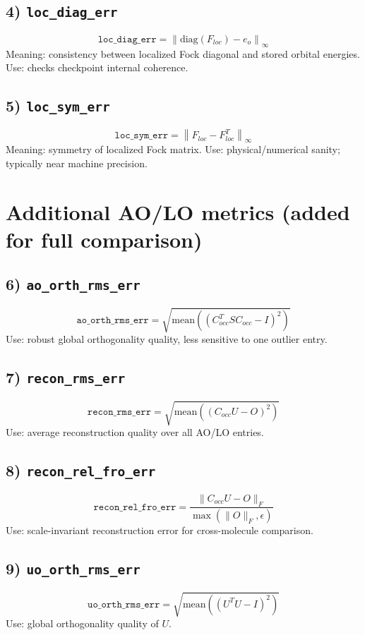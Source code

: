 \documentclass[11pt]{article}
\begin{document}
\subsection*{4) \texttt{loc\_diag\_err}}
\[
\texttt{loc\_diag\_err}=\left\|\mathrm{diag}(F_{loc})-e_o\right\|_\infty
\]
Meaning: consistency between localized Fock diagonal and stored orbital energies.
Use: checks checkpoint internal coherence.

\subsection*{5) \texttt{loc\_sym\_err}}
\[
\texttt{loc\_sym\_err}=\left\|F_{loc}-F_{loc}^T\right\|_\infty
\]
Meaning: symmetry of localized Fock matrix.
Use: physical/numerical sanity; typically near machine precision.

\section{Additional AO/LO metrics (added for full comparison)}
\subsection*{6) \texttt{ao\_orth\_rms\_err}}
\[
\texttt{ao\_orth\_rms\_err}=\sqrt{\mathrm{mean}\left((C_{occ}^TSC_{occ}-I)^2\right)}
\]
Use: robust global orthogonality quality, less sensitive to one outlier entry.

\subsection*{7) \texttt{recon\_rms\_err}}
\[
\texttt{recon\_rms\_err}=\sqrt{\mathrm{mean}\left((C_{occ}U-O)^2\right)}
\]
Use: average reconstruction quality over all AO/LO entries.

\subsection*{8) \texttt{recon\_rel\_fro\_err}}
\[
\texttt{recon\_rel\_fro\_err}=\frac{\|C_{occ}U-O\|_F}{\max(\|O\|_F,\epsilon)}
\]
Use: scale-invariant reconstruction error for cross-molecule comparison.

\subsection*{9) \texttt{uo\_orth\_rms\_err}}
\[
\texttt{uo\_orth\_rms\_err}=\sqrt{\mathrm{mean}\left((U^TU-I)^2\right)}
\]
Use: global orthogonality quality of $U$.
\end{document}
